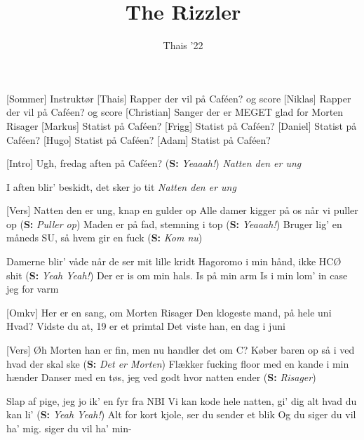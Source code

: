 \documentclass[a4paper,11pt]{article}
\title{The Rizzler}
\author{Thais '22}
\begin{document}
\maketitle

\begin{roles}
[Sommer] Instruktør
[Thais] Rapper der vil på Caféen? og score
[Niklas] Rapper der vil på Caféen? og score
[Christian] Sanger der er MEGET glad for Morten Risager
[Markus] Statist på Caféen?
[Frigg] Statist på Caféen?
[Daniel] Statist på Caféen?
[Hugo] Statist på Caféen?
[Adam] Statist på Caféen?
\end{roles}

\begin{song}
    [Intro] Ugh, fredag aften på Caféen? (\textbf{S:} \textit{Yeaaah!})
     \textit{Natten den er ung}
    
     I aften blir' beskidt, det sker jo tit
     \textit{Natten den er ung}
    
    [Vers] Natten den er ung, knap en gulder op
                Alle damer kigger på os når vi puller op (\textbf{S:} \textit{Puller op})
                Maden er på fad, stemning i top (\textbf{S:} \textit{Yeaaah!})
                Bruger lig' en måneds SU, så hvem gir en fuck (\textbf{S:} \textit{Kom nu})
    
     Damerne blir' våde når de ser mit lille kridt
                Hagoromo i min hånd, ikke HCØ shit (\textbf{S:} \textit{Yeah Yeah!})
                Der er is om min hals. Is på min arm
                Is i min lom' in case jeg for varm

    [Omkv] Her er en sang, om Morten Risager
                Den klogeste mand, på hele uni
     Hvad?
     Vidste du at, 19 er et primtal
                Det viste han, en dag i juni

    [Vers] Øh Morten han er fin, men nu handler det om C?
                Køber baren op så i ved hvad der skal ske (\textbf{S:} \textit{Det er Morten})
                Flækker fucking floor med en kande i min hænder
                Danser med en tøs, jeg ved godt hvor natten ender (\textbf{S:} \textit{Risager})

     Slap af pige, jeg jo ik' en fyr fra NBI
                Vi kan kode hele natten, gi' dig alt hvad du kan li'  
                (\textbf{S:} \textit{Yeah Yeah!})
                Alt for kort kjole, ser du sender et blik
                Og du siger du vil ha' mig. siger du vil ha' min-


\end{song}
\end{document}

